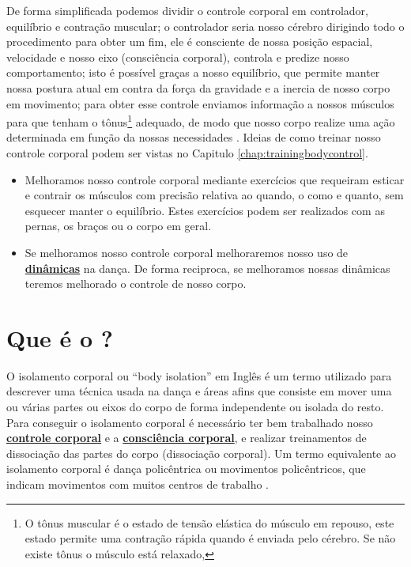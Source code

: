 De forma simplificada podemos dividir o controle corporal em controlador, equilíbrio e contração muscular;
o controlador seria nosso cérebro dirigindo todo o procedimento para obter um fim,
ele é consciente de nossa posição espacial, velocidade e nosso eixo (consciência corporal), 
controla e predize nosso comportamento; isto é possível graças a nosso equilíbrio,
que permite manter nossa postura atual em contra da força da gravidade e a inercia de nosso corpo em movimento;
para obter esse controle enviamos informação a nossos músculos para que tenham o 
tônus\footnote{O tônus muscular é o estado de tensão elástica do músculo em repouso,
este estado permite uma contração rápida quando é enviada pelo cérebro.
Se não existe tônus o músculo está relaxado,} adequado,
de modo que nosso corpo realize uma ação determinada em função da nossas necessidades
 \cite[pp. 17]{bolio2006fantasia}.
Ideias de como treinar nosso controle corporal podem ser vistas no Capitulo \ref{chap:trainingbodycontrol}.


\begin{tcbattention}
\begin{itemize}
\item Melhoramos nosso controle corporal mediante exercícios que requeiram
esticar e contrair os músculos com precisão relativa ao quando, o como e quanto, 
sem esquecer manter o equilíbrio.
Estes exercícios podem ser realizados com as pernas, os braços ou o corpo em geral.
\item Se melhoramos nosso controle corporal melhoraremos nosso uso de 
\hyperref[sec:musicalidade:dinamicas]{\textbf{dinâmicas}} na dança.
De forma reciproca, se melhoramos nossas dinâmicas teremos melhorado o controle de nosso corpo.
\end{itemize}
\end{tcbattention}
\section{Que é o \bodyisolation?}
\label{sec:BodyIsolation}


O isolamento corporal ou ``body isolation'' em Inglês é um termo utilizado
para descrever uma técnica usada na dança e áreas afins que 
consiste em mover uma ou várias partes ou eixos do corpo
de forma independente ou isolada do resto.
Para conseguir o isolamento corporal é necessário ter bem trabalhado nosso 
\hyperref[sec:BodyControl]{\textbf{controle corporal}} e a
\hyperref[sec:BodyAwareness]{\textbf{consciência corporal}},
e realizar treinamentos de dissociação das partes do corpo (dissociação corporal).
Um termo equivalente ao isolamento corporal é dança policêntrica ou movimentos policêntricos,
que indicam movimentos com muitos centros de trabalho \cite[pp. 25]{grob2020dance}.

